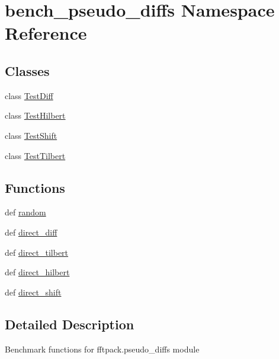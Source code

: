 \hypertarget{namespacebench__pseudo__diffs}{}\section{bench\+\_\+pseudo\+\_\+diffs Namespace Reference}
\label{namespacebench__pseudo__diffs}
\subsection*{Classes}
\begin{DoxyCompactItemize}
\item 
class \hyperlink{classbench__pseudo__diffs_1_1TestDiff}{Test\+Diff}
\item 
class \hyperlink{classbench__pseudo__diffs_1_1TestHilbert}{Test\+Hilbert}
\item 
class \hyperlink{classbench__pseudo__diffs_1_1TestShift}{Test\+Shift}
\item 
class \hyperlink{classbench__pseudo__diffs_1_1TestTilbert}{Test\+Tilbert}
\end{DoxyCompactItemize}
\subsection*{Functions}
\begin{DoxyCompactItemize}
\item 
def \hyperlink{namespacebench__pseudo__diffs_a1ca7868423eefe3786bfd2059c133f62}{random}
\item 
def \hyperlink{namespacebench__pseudo__diffs_a3f3a6b2a5937d960e7b9882229f32a9d}{direct\+\_\+diff}
\item 
def \hyperlink{namespacebench__pseudo__diffs_ac6041bd04f9ec3762a7ae0519276a506}{direct\+\_\+tilbert}
\item 
def \hyperlink{namespacebench__pseudo__diffs_ada1f0a1f4873252398dba48100403bfa}{direct\+\_\+hilbert}
\item 
def \hyperlink{namespacebench__pseudo__diffs_ab0b5aa743b7c029327d2a981651afba2}{direct\+\_\+shift}
\end{DoxyCompactItemize}


\subsection{Detailed Description}
\begin{DoxyVerb}Benchmark functions for fftpack.pseudo_diffs module
\end{DoxyVerb}
 

